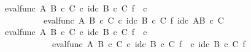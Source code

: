\begin{isabellebody}
\ {\isachardoublequoteopen}eval{\isacharunderscore}{\kern0pt}func\ A\ {\isacharparenleft}{\kern0pt}B\ {\isasymtimes}\isactrlsub c\ C{\isacharparenright}{\kern0pt}\ {\isasymcirc}\isactrlsub c\ {\isacharparenleft}{\kern0pt}id\isactrlsub c\ {\isacharparenleft}{\kern0pt}B\ {\isasymtimes}\isactrlsub c\ C{\isacharparenright}{\kern0pt}\ {\isasymtimes}\isactrlsub f\ {\isacharparenleft}{\kern0pt}{\isasympsi}\isactrlsup {\isasymsharp}\ {\isasymcirc}\isactrlsub c\ {\isasymphi}\isactrlsup {\isasymsharp}\isactrlsup {\isasymsharp}{\isacharparenright}{\kern0pt}{\isacharparenright}{\kern0pt}\ {\isacharequal}{\kern0pt}\ \isanewline
\ \ \ \ \ \ \ \ \ \ eval{\isacharunderscore}{\kern0pt}func\ A\ {\isacharparenleft}{\kern0pt}B\ {\isasymtimes}\isactrlsub c\ C{\isacharparenright}{\kern0pt}\ {\isasymcirc}\isactrlsub c\ id\isactrlsub c\ {\isacharparenleft}{\kern0pt}B\ {\isasymtimes}\isactrlsub c\ C{\isacharparenright}{\kern0pt}\ {\isasymtimes}\isactrlsub f\ id\isactrlsub c\ {\isacharparenleft}{\kern0pt}A\isactrlbsup {\isacharparenleft}{\kern0pt}B\ {\isasymtimes}\isactrlsub c\ C{\isacharparenright}{\kern0pt}\isactrlesup {\isacharparenright}{\kern0pt}{\isachardoublequoteclose}\isanewline
\ \ \ \ \isamarkupfalse%
\ {\isacharminus}{\kern0pt}\isanewline
\ \ \ \ \ \ \isamarkupfalse%
\ {\isachardoublequoteopen}eval{\isacharunderscore}{\kern0pt}func\ A\ {\isacharparenleft}{\kern0pt}B\ {\isasymtimes}\isactrlsub c\ C{\isacharparenright}{\kern0pt}\ {\isasymcirc}\isactrlsub c\ {\isacharparenleft}{\kern0pt}id\isactrlsub c\ {\isacharparenleft}{\kern0pt}B\ {\isasymtimes}\isactrlsub c\ C{\isacharparenright}{\kern0pt}\ {\isasymtimes}\isactrlsub f\ {\isacharparenleft}{\kern0pt}{\isasympsi}\isactrlsup {\isasymsharp}\ {\isasymcirc}\isactrlsub c\ {\isasymphi}\isactrlsup {\isasymsharp}\isactrlsup {\isasymsharp}{\isacharparenright}{\kern0pt}{\isacharparenright}{\kern0pt}\ {\isacharequal}{\kern0pt}\isanewline
\ \ \ \ \ \ \ \ \ \ \ \ eval{\isacharunderscore}{\kern0pt}func\ A\ {\isacharparenleft}{\kern0pt}B\ {\isasymtimes}\isactrlsub c\ C{\isacharparenright}{\kern0pt}\ {\isasymcirc}\isactrlsub c\ {\isacharparenleft}{\kern0pt}{\isacharparenleft}{\kern0pt}id\isactrlsub c\ {\isacharparenleft}{\kern0pt}B\ {\isasymtimes}\isactrlsub c\ C{\isacharparenright}{\kern0pt}\ {\isasymtimes}\isactrlsub f\ {\isacharparenleft}{\kern0pt}{\isasympsi}\isactrlsup {\isasymsharp}{\isacharparenright}{\kern0pt}{\isacharparenright}{\kern0pt}\ {\isasymcirc}\isactrlsub c\ {\isacharparenleft}{\kern0pt}id\isactrlsub c\ {\isacharparenleft}{\kern0pt}B\ {\isasymtimes}\isactrlsub c\ C{\isacharparenright}{\kern0pt}\ {\isasymtimes}\isactrlsub f\ {\isasymphi}\isactrlsup {\isasymsharp}\isactrlsup {\isasymsharp}{\isacharparenright}{\kern0pt}{\isacharparenright}{\kern0pt}{\isachardoublequoteclose}\isanewline

\end{isabellebody}
